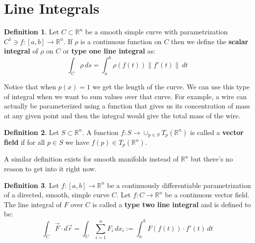 \documentclass[11pt,a4paper]{article}
\theoremstyle{definition}
\newtheorem{definition}{Definition}[section]
\theoremstyle{plain}
\newcommand{\R}{\mathbb{R}}
\begin{document}
	\newpage
	
	\section{Line Integrals}
	
	\begin{definition}
		Let $C \subset \R^n$ be a smooth simple curve with 
		parametrization $C^1 \ni f \colon [a,b] \to \R^n$. If $\rho$ is
		a continuous function on $C$ then we define the 
		\textbf{scalar integral} of $\rho$ on $C$ or \textbf{type one
		line integral} as:
		\[
			\int_{C}{\rho \,ds} = \int_{a}^{b}{\rho(f(t))\|f'(t)\|\,dt}
		\]
	\end{definition}
	Notice that when $p(x) = 1$ we get the length of the curve. We can
	use this type of integral when we want to sum values over that
	curve. For example, a wire can actually be parameterized using
	a function that gives us its concentration of mass at any given
	point and then the integral would give the total mass of the wire.
	\begin{definition}
		Let $S \subset \R^n$. A function 
		$f \colon S \to \cup_{p \in S}{T_p(\R^n)}$ is called a
		\textbf{vector field} if for all $p \in S$ we have
		$f(p) \in T_p(\R^n)$.
	\end{definition}
	A similar definition exists for smooth manifolds instead of $\R^n$ 
	but there's no reason to get into it right now.
	\begin{definition}
		Let $f \colon [a,b] \to \R^n$ be a continuously differentiable
		parametrization of a directed, smooth, simple curve $C$.
		Let $f \colon C \to \R^n$ be a continuous vector field. The
		line integral of $F$ over $C$ is called a \textbf{type two
		line integral} and is defined to be:
		\[
			\int_{C}{\vec{F} \cdot d\vec{r}} = 
			\int_{C}{\sum_{i=1}^{n}{F_i}\,dx_i} :=
			\int_{a}^{b}{F(f(t)) \cdot f'(t) \,dt}
		\]
	\end{definition}
	
	\newpage
	
\end{document}
